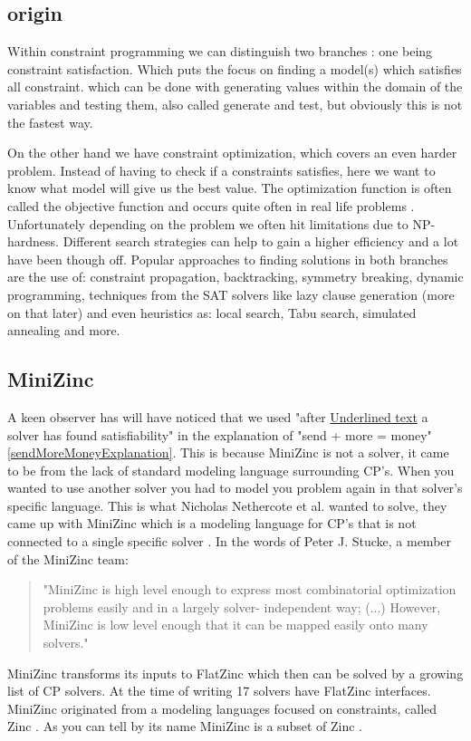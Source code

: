 \subsection{origin}
Within constraint programming we can distinguish two branches \cite{52bartak1999constraint}: one being constraint satisfaction. Which puts the focus on finding a model(s) which satisfies all constraint. which can be done with generating values within the domain of the variables and testing them, also called generate and test, but obviously this is not the fastest way. 

On the other hand we have constraint optimization, which covers an even harder problem. Instead of having to check if a constraints satisfies, here we want to know what model will give us the best value. The optimization function is often called the objective function and occurs quite often in real life problems \cite{52bartak1999constraint}. Unfortunately depending on the problem we often hit limitations due to NP-hardness. Different search strategies can help to gain a higher efficiency and a lot have been though off. Popular approaches to finding solutions in both branches are the use of: constraint propagation, backtracking, symmetry breaking, dynamic programming, techniques from the SAT solvers like lazy clause generation (more on that later) and even heuristics as: local search, Tabu search, simulated annealing and more. 

\subsection{MiniZinc}
A keen observer has will have noticed that we used "after \underline{Underlined text} a solver has found satisfiability" in the explanation of "send + more = money" \ref{sendMoreMoneyExplanation}. This is because MiniZinc is not a solver, it came to be from the lack of standard modeling language surrounding CP's. When you wanted to use another solver you had to model you problem again in that solver's specific language. This is what Nicholas Nethercote et al. wanted to solve, they came up with MiniZinc which is a modeling language for CP's that is not connected to a single specific solver \cite{57nethercote2007minizinc}. 
In the words of Peter J. Stucke, a member of the MiniZinc team: 

\begin{quote}
	"MiniZinc is high level enough to express most combinatorial optimization problems easily and in a largely solver-
	independent way; (...) However, MiniZinc is low level enough that it can be mapped easily onto many solvers." \cite{58stuckey2014minizinc}
\end{quote}
MiniZinc transforms its inputs to FlatZinc which then can be solved by a growing list of CP solvers. At the time of writing 17 solvers have FlatZinc interfaces. MiniZinc originated from a modeling languages focused on constraints, called Zinc \cite{68incbanda2006modelling}. As you can tell by its name MiniZinc is a subset of Zinc \cite{57nethercote2007minizinc}.

